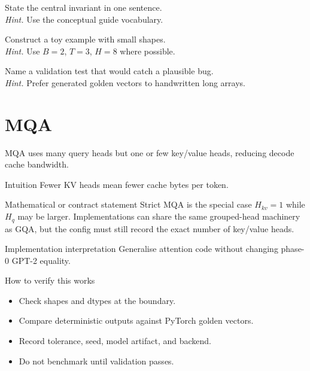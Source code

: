 \begin{chapterexercises}
\item State the central invariant in one sentence.\\
\textit{Hint.} Use the conceptual guide vocabulary.
\item Construct a toy example with small shapes.\\
\textit{Hint.} Use $B=2$, $T=3$, $H=8$ where possible.
\item Name a validation test that would catch a plausible bug.\\
\textit{Hint.} Prefer generated golden vectors to handwritten long arrays.
\end{chapterexercises}

\chapter{MQA}
\label{ch:mqa}
MQA uses many query heads but one or few key/value heads, reducing decode cache bandwidth. \citep{shazeer2019mqa}



\begin{intuitionbox}{Intuition}
Fewer KV heads mean fewer cache bytes per token.
\end{intuitionbox}

\begin{definitionbox}{Mathematical or contract statement}
Strict MQA is the special case \(H_{kv}=1\) while \(H_q\) may be larger. Implementations can share the same grouped-head machinery as GQA, but the config must still record the exact number of key/value heads.
\end{definitionbox}

\begin{implementationbox}{Implementation interpretation}
Generalise attention code without changing phase-0 GPT-2 equality.
\end{implementationbox}

\begin{verificationbox}{How to verify this works}
\begin{itemize}
\item Check shapes and dtypes at the boundary.
\item Compare deterministic outputs against PyTorch golden vectors.
\item Record tolerance, seed, model artifact, and backend.
\item Do not benchmark until validation passes.
\end{itemize}
\end{verificationbox}


